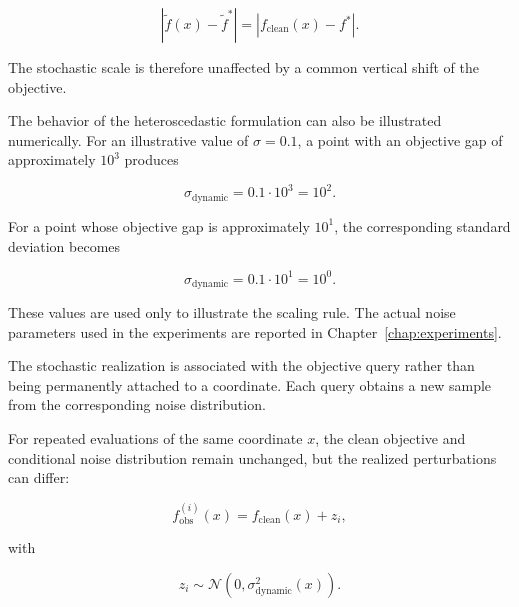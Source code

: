 \begin{equation}
\left|
\tilde{f}(x) - \tilde{f}^{*}
\right|
=
\left|
f_{\mathrm{clean}}(x) - f^*
\right|.
\end{equation}

The stochastic scale is therefore unaffected by a common vertical shift of
the objective.

The behavior of the heteroscedastic formulation can also be illustrated
numerically. For an illustrative value of $\sigma = 0.1$, a point with an
objective gap of approximately $10^3$ produces

\begin{equation}
\sigma_{\mathrm{dynamic}}
=
0.1 \cdot 10^3
=
10^2.
\label{eq:dynamic_std_example_large}
\end{equation}

For a point whose objective gap is approximately $10^1$, the corresponding
standard deviation becomes

\begin{equation}
\sigma_{\mathrm{dynamic}}
=
0.1 \cdot 10^1
=
10^0.
\label{eq:dynamic_std_example_small}
\end{equation}

These values are used only to illustrate the scaling rule. The actual noise
parameters used in the experiments are reported in
Chapter~\ref{chap:experiments}.



The stochastic realization is associated with the objective query rather than
being permanently attached to a coordinate. Each query obtains a new sample
from the corresponding noise distribution.

For repeated evaluations of the same coordinate $x$, the clean objective and
conditional noise distribution remain unchanged, but the realized
perturbations can differ:

\begin{equation}
f_{\mathrm{obs}}^{(i)}(x)
=
f_{\mathrm{clean}}(x) + z_i,
\label{eq:independent_noise_realizations}
\end{equation}

with

\begin{equation}
z_i
\sim
\mathcal{N}
\left(
0,
\sigma_{\mathrm{dynamic}}^2(x)
\right).
\end{equation}

